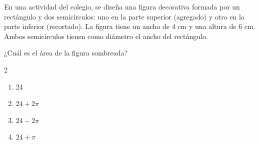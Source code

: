 En una actividad del colegio, se diseña una figura decorativa formada por un rectángulo y dos semicírculos: uno en la parte superior (agregado) y otro en la parte inferior (recortado). La figura tiene un ancho de 4 cm y una altura de 6 cm. Ambos semicírculos tienen como diámetro el ancho del rectángulo.

\begin{center}
\end{center}

¿Cuál es el área de la figura sombreada?

\begin{multicols}{2}
\begin{enumerate}[label=\alph*), leftmargin=*]
\item $24$
\item $24 + 2\pi$
\item $24 - 2\pi$
\item $24 + \pi$
\end{enumerate}
\end{multicols}